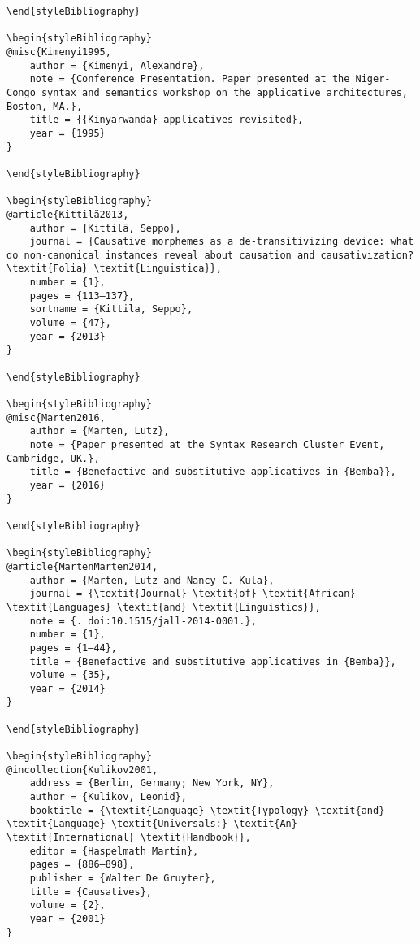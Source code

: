 \documentclass[output=paper,modfonts,nonflat]{langsci/langscibook}
\begin{document}
\begin{verbatim}
\end{styleBibliography}

\begin{styleBibliography}
@misc{Kimenyi1995,
	author = {Kimenyi, Alexandre},
	note = {Conference Presentation. Paper presented at the Niger-Congo syntax and semantics workshop on the applicative architectures, Boston, MA.},
	title = {{Kinyarwanda} applicatives revisited},
	year = {1995}
}

\end{styleBibliography}

\begin{styleBibliography}
@article{Kittilä2013,
	author = {Kittilä, Seppo},
	journal = {Causative morphemes as a de-transitivizing device: what do non-canonical instances reveal about causation and causativization? \textit{Folia} \textit{Linguistica}},
	number = {1},
	pages = {113–137},
	sortname = {Kittila, Seppo},
	volume = {47},
	year = {2013}
}

\end{styleBibliography}

\begin{styleBibliography}
@misc{Marten2016,
	author = {Marten, Lutz},
	note = {Paper presented at the Syntax Research Cluster Event, Cambridge, UK.},
	title = {Benefactive and substitutive applicatives in {Bemba}},
	year = {2016}
}

\end{styleBibliography}

\begin{styleBibliography}
@article{MartenMarten2014,
	author = {Marten, Lutz and Nancy C. Kula},
	journal = {\textit{Journal} \textit{of} \textit{African} \textit{Languages} \textit{and} \textit{Linguistics}},
	note = {. doi:10.1515/jall-2014-0001.},
	number = {1},
	pages = {1–44},
	title = {Benefactive and substitutive applicatives in {Bemba}},
	volume = {35},
	year = {2014}
}

\end{styleBibliography}

\begin{styleBibliography}
@incollection{Kulikov2001,
	address = {Berlin, Germany; New York, NY},
	author = {Kulikov, Leonid},
	booktitle = {\textit{Language} \textit{Typology} \textit{and} \textit{Language} \textit{Universals:} \textit{An} \textit{International} \textit{Handbook}},
	editor = {Haspelmath Martin},
	pages = {886–898},
	publisher = {Walter De Gruyter},
	title = {Causatives},
	volume = {2},
	year = {2001}
}


\end{verbatim}
\end{document}
